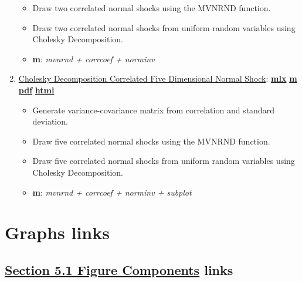 \documentclass[
]{book}
\providecommand{\tightlist}{%
  \setlength{\itemsep}{0pt}\setlength{\parskip}{0pt}}
\begin{document}
\begin{enumerate}
  \begin{itemize}
  \tightlist
  \item
    Draw two correlated normal shocks using the MVNRND function.
  \item
    Draw two correlated normal shocks from uniform random variables using Cholesky Decomposition.
  \item
    \textbf{m}: \emph{mvnrnd + corrcoef + norminv}
  \end{itemize}
\item
  \href{https://fanwangecon.github.io/M4Econ/simulation/normal/htmlpdfm/fs_cholesky_decomposition_d5.html}{Cholesky Decomposition Correlated Five Dimensional Normal Shock}: \href{https://github.com/FanWangEcon/M4Econ/blob/master/simulation/normal/fs_cholesky_decomposition_d5.mlx}{\textbf{mlx}} \textbar{} \href{https://github.com/FanWangEcon/M4Econ/blob/master/simulation/normal/htmlpdfm/fs_cholesky_decomposition_d5.m}{\textbf{m}} \textbar{} \href{https://github.com/FanWangEcon/M4Econ/blob/master/simulation/normal/htmlpdfm/fs_cholesky_decomposition_d5.pdf}{\textbf{pdf}} \textbar{} \href{https://fanwangecon.github.io/M4Econ/simulation/normal/htmlpdfm/fs_cholesky_decomposition_d5.html}{\textbf{html}}

  \begin{itemize}
  \tightlist
  \item
    Generate variance-covariance matrix from correlation and standard deviation.
  \item
    Draw five correlated normal shocks using the MVNRND function.
  \item
    Draw five correlated normal shocks from uniform random variables using Cholesky Decomposition.
  \item
    \textbf{m}: \emph{mvnrnd + corrcoef + norminv + subplot}
  \end{itemize}
\end{enumerate}

\hypertarget{graphs-links}{%
\section{Graphs links}\label{graphs-links}}

\hypertarget{section-5.1-figure-componentsfigure-components-links}{%
\subsection{\texorpdfstring{\protect\hyperlink{figure-components}{Section 5.1 Figure Components} links}{Section 5.1 Figure Components links}}\label{section-5.1-figure-componentsfigure-components-links}}
\end{document}
